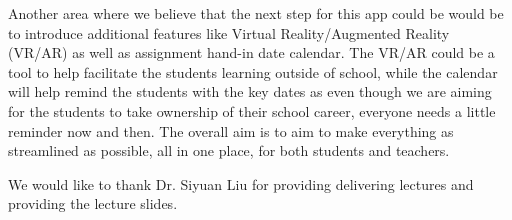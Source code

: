 \documentclass[sigchi]{acmart}
\begin{document}
Another area where we believe that the next step for this app could be would be to introduce additional features like Virtual Reality/Augmented Reality (VR/AR) as well as assignment hand-in date calendar. The VR/AR could be a tool to help facilitate the students learning outside of school, while the calendar will help remind the students with the key dates as even though we are aiming for the students to take ownership of their school career, everyone needs a little reminder now and then. The overall aim is to aim to make everything as streamlined as possible, all in one place, for both students and teachers.
\begin{acks}
We would like to thank Dr. Siyuan Liu for providing delivering lectures and providing the lecture slides.
\end{acks}



\end{document}
